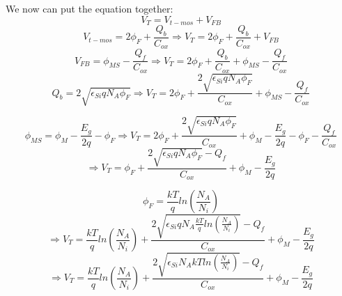 We now can put the equation together:
\begin{equation}
V_T = V_{t-mos} + V_{FB}
\end{equation}
\begin{equation}
V_{t-mos}=2 \phi_F + \frac{Q_b}{C_{ox}}
\Rightarrow
V_T = 2 \phi_F + \frac{Q_b}{C_{ox}} + V_{FB}
\end{equation}
\begin{equation}
V_{FB}
=
\phi_{MS}-\frac{Q_f}{C_{ox}}
\Rightarrow
V_T = 2 \phi_F + \frac{Q_b}{C_{ox}} + \phi_{MS}-\frac{Q_f}{C_{ox}}
\end{equation}
\begin{equation}
Q_b
=
2 \sqrt{\epsilon_{Si} q N_A \phi_F }
\Rightarrow
V_T = 2 \phi_F + \frac{2 \sqrt{\epsilon_{Si} q N_A \phi_F }}{C_{ox}} + \phi_{MS}-\frac{Q_f}{C_{ox}}
\end{equation}


\begin{equation}
\phi_{MS}
=
\phi_{M} - \frac{E_g}{2 q}-\phi_F
\Rightarrow
V_T = 2 \phi_F + \frac{2 \sqrt{\epsilon_{Si} q N_A \phi_F }}{C_{ox}} + \phi_{M} - \frac{E_g}{2 q}-\phi_F -\frac{Q_f}{C_{ox}}
\end{equation}
\begin{equation}
\Rightarrow
V_T = \phi_F + \frac{2 \sqrt{\epsilon_{Si} q N_A \phi_F }-Q_f}{C_{ox}} + \phi_{M} - \frac{E_g}{2 q}
\end{equation}


\begin{equation}
\phi_F
=
\frac{k T}{q} ln\left(\frac{N_A}{N_i}\right)
\end{equation}
\begin{equation}
\Rightarrow
V_T = \frac{k T}{q} ln\left(\frac{N_A}{N_i}\right) + \frac{2 \sqrt{\epsilon_{Si} q N_A \frac{k T}{q} ln\left(\frac{N_A}{N_i}\right) }-Q_f}{C_{ox}} + \phi_{M} - \frac{E_g}{2 q}
\end{equation}
\begin{equation}
\boxed{
\Rightarrow
V_T = \frac{k T}{q} ln\left(\frac{N_A}{N_i}\right) + \frac{2 \sqrt{\epsilon_{Si} N_A k T ln\left(\frac{N_A}{N_i}\right) }-Q_f}{C_{ox}} + \phi_{M} - \frac{E_g}{2 q}
}
\end{equation}

